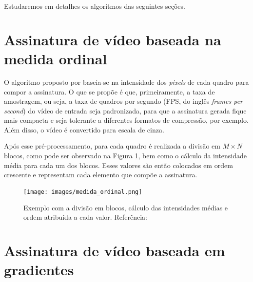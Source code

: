 \label{sec:desenv}
Estudaremos em detalhes os algoritmos das seguintes seções.


%
%
\section{Assinatura de vídeo baseada na medida ordinal}
\label{sec:med_ordinal}

	O algoritmo proposto por \cite{hua2004robust} baseia-se na intensidade dos \textit{pixels} de cada quadro para compor a assinatura. O que se propõe é que, primeiramente, a taxa de amostragem, ou seja, a taxa de quadros por segundo (FPS, do inglês \textit{frames per second}) do vídeo de entrada seja padronizada, para que a assinatura gerada fique mais compacta e seja tolerante a diferentes formatos de compressão, por exemplo. Além disso, o vídeo é convertido para escala de cinza.

Após esse pré-processamento, para cada quadro é realizada a divisão em $M \times N$ blocos, como pode ser observado na Figura \ref{fig:medidaord}, bem como o cálculo da intensidade média para cada um dos blocos. Esses valores são então colocados em ordem crescente e representam cada elemento que compõe a assinatura.

	\begin{figure}[h]
        \centering
        \texttt{[image: images/medida\_ordinal.png]}
        \caption{Exemplo com a divisão em blocos, cálculo das intensidades médias e ordem atribuída a cada valor. Referência: \cite{sylvio2015}}
    	\label{fig:medidaord}
    \end{figure}


%
%


\section{Assinatura de vídeo baseada em gradientes}
\label{sec:gradientes}

